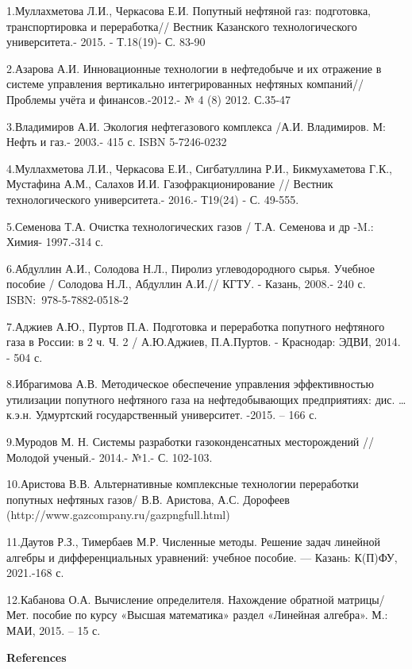 \begin{noparindent}
1.Муллахметова Л.И., Черкасова Е.И. Попутный нефтяной газ: подготовка,
транспортировка и переработка// Вестник Казанского технологического
университета.- 2015. - Т.18(19)- С. 83-90

2.Азарова А.И. Инновационные технологии в нефтедобыче и их отражение в
системе управления вертикально интегрированных нефтяных компаний//
Проблемы учёта и финансов.-2012.- № 4 (8) 2012. С.35-47

3.Владимиров А.И. Экология нефтегазового комплекса /А.И. Владимиров. М:
Нефть и газ.- 2003.- 415 с. ISBN 5-7246-0232

4.Муллахметова Л.И., Черкасова Е.И., Сигбатуллина Р.И., Бикмухаметова
Г.К., Мустафина А.М., Салахов И.И. Газофракционирование // Вестник
технологического университета.- 2016.- Т19(24) - С. 49-555.

5.Семенова Т.А. Очистка технологических газов / Т.А. Семенова и др -M.:
Химия- 1997.-314 с.

6.Абдуллин А.И., Солодова Н.Л., Пиролиз углеводородного сырья. Учебное
пособие / Солодова Н.Л., Абдуллин А.И.// КГТУ. - Казань, 2008.- 240 с.
ISBN:~978-5-7882-0518-2

7.Аджиев А.Ю., Пуртов П.А. Подготовка и переработка попутного нефтяного
газа в России: в 2 ч. Ч. 2 / А.Ю.Аджиев, П.А.Пуртов. - Краснодар: ЭДВИ,
2014. - 504 с.

8.Ибрагимова А.В. Методическое обеспечение управления эффективностью
утилизации попутного нефтяного газа на нефтедобывающих предприятиях:
дис. \ldots{} к.э.н. Удмуртский государственный университет. -2015. --
166 с.

9.Муродов М. Н. Системы разработки газоконденсатных месторождений //
Молодой ученый.- 2014.- №1.- С. 102-103.

10.Аристова В.В. Альтернативные комплексные технологии переработки
попутных нефтяных газов/ В.В. Аристова, А.С. Дорофеев
(http://www.gazcompany.ru/gazpngfull.html)

11.Даутов Р.З., Тимербаев М.Р. Численные методы. Решение задач линейной
алгебры и дифференциальных уравнений: учебное пособие. --- Казань:
К(П)ФУ, 2021.-168 с.

12.Кабанова О.А. Вычисление определителя. Нахождение обратной матрицы/
Мет. пособие по курсу «Высшая математика» раздел «Линейная алгебра». М.:
МАИ, 2015. -- 15 с.
\end{noparindent}

\begin{center}
{\bfseries References}
\end{center}

